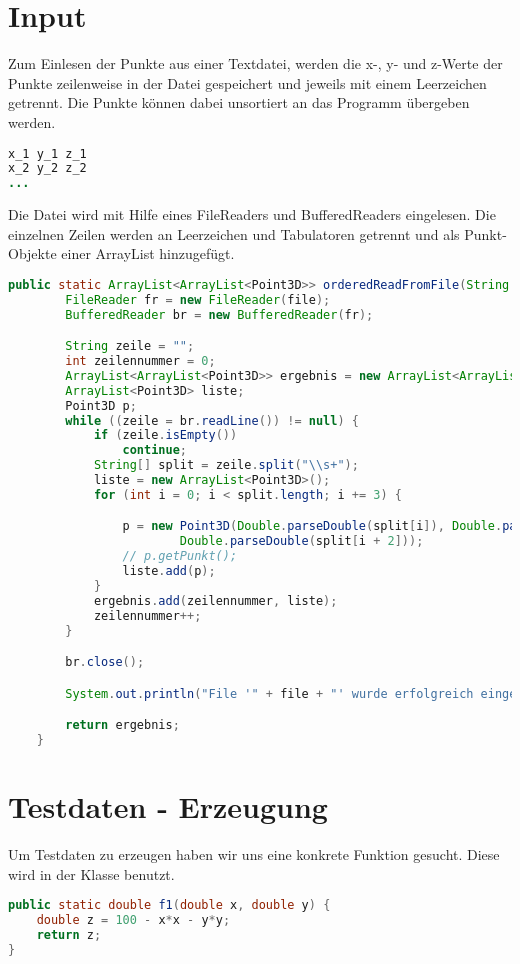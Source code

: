 \documentclass[11pt, bibliography=totocnumbered]{scrartcl}
\begin{document}
\section{Input}
Zum Einlesen der Punkte aus einer Textdatei, werden die x-, y- und z-Werte der Punkte zeilenweise in der Datei gespeichert und jeweils mit einem Leerzeichen getrennt. Die Punkte k\"onnen dabei unsortiert an das Programm \"ubergeben werden. 
\begin{lstlisting}[caption={Input-Datei}, label={lst:label}, language=Java] 
x_1 y_1 z_1
x_2 y_2 z_2
...
\end{lstlisting}
Die Datei wird mit Hilfe eines FileReaders und BufferedReaders eingelesen. Die einzelnen Zeilen werden an Leerzeichen und Tabulatoren getrennt und als Punkt-Objekte einer ArrayList hinzugef\"ugt.
\begin{lstlisting}[caption={Input-Quellcode}, label={lst:label}, language=Java]
public static ArrayList<ArrayList<Point3D>> orderedReadFromFile(String file) throws IOException {
		FileReader fr = new FileReader(file);
		BufferedReader br = new BufferedReader(fr);

		String zeile = "";
		int zeilennummer = 0;
		ArrayList<ArrayList<Point3D>> ergebnis = new ArrayList<ArrayList<Point3D>>();
		ArrayList<Point3D> liste;
		Point3D p;
		while ((zeile = br.readLine()) != null) {
			if (zeile.isEmpty())
				continue;
			String[] split = zeile.split("\\s+");
			liste = new ArrayList<Point3D>();
			for (int i = 0; i < split.length; i += 3) {

				p = new Point3D(Double.parseDouble(split[i]), Double.parseDouble(split[i + 1]),
						Double.parseDouble(split[i + 2]));
				// p.getPunkt();
				liste.add(p);
			}
			ergebnis.add(zeilennummer, liste);
			zeilennummer++;
		}

		br.close();

		System.out.println("File '" + file + "' wurde erfolgreich eingelesen.");

		return ergebnis;
	}
\end{lstlisting}

\section{Testdaten - Erzeugung}

Um Testdaten zu erzeugen haben wir uns eine konkrete Funktion gesucht. Diese wird in der Klasse \grqq benutzt. 

\begin{lstlisting}[caption={Funktion zur Testdaten-Erzeugung}, label={lst:label}, language=Java]
public static double f1(double x, double y) {
	double z = 100 - x*x - y*y;
	return z;
}
\end{lstlisting}
\end{document}
